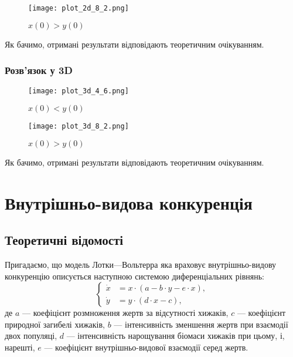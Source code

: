 \begin{figure}[H]
	\centering
	\caption{$x(0) > y(0)$}
	\texttt{[image: plot\_2d\_8\_2.png]}
\end{figure}

Як бачимо, отримані результати відповідають теоретичним очікуванням.

\newpage
	
\subsubsection{Розв'язок у 3D}

\begin{minipage}[t]{.5\textwidth}
	\begin{figure}[H]
		\centering
		\caption{$x(0) < y(0)$}
		\texttt{[image: plot\_3d\_4\_6.png]}
	\end{figure}
\end{minipage}
\begin{minipage}[t]{.5\textwidth}
	\begin{figure}[H]
		\centering
		\caption{$x(0) > y(0)$}
		\texttt{[image: plot\_3d\_8\_2.png]}
	\end{figure}
\end{minipage}

Як бачимо, отримані результати відповідають теоретичним очікуванням.

\section{Внутрішньо-видова конкуренція}

\subsection{Теоретичні відомості}

Пригадаємо, що модель Лотки---Вольтерра яка враховує внутрішньо-видову конкуренцію описується наступною системою диференціальних рівнянь:
\begin{equation}
	\left\{
		\begin{aligned}
			\dot x &= x \cdot (a - b \cdot y - e \cdot x), \\
			\dot y &= y \cdot (d \cdot x - c),
		\end{aligned}
	\right.
\end{equation}
де $a$ --- коефіцієнт розмноження жертв за відсутності хижаків, $c$ --- коефіцієнт природної загибелі хижаків, $b$ --- інтенсивність зменшення жертв при взаємодії двох популяці, $d$ --- інтенсивність нарощування біомаси хижаків при цьому, і, нарешті, $e$ --- коефіцієнт внутрішньо-видової взаємодії серед жертв. \medskip

